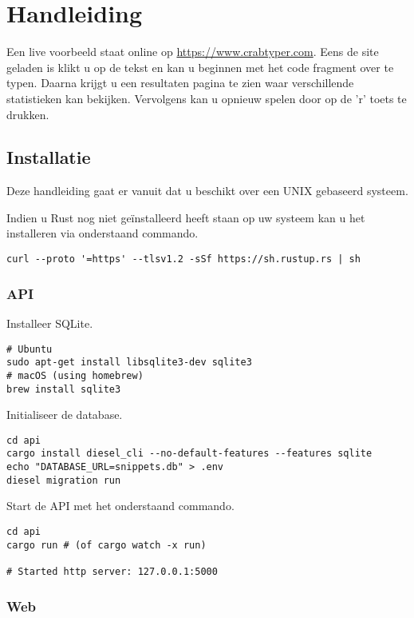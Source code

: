 \chapter{Handleiding}

Een live voorbeeld staat online op \url{https://www.crabtyper.com}. Eens de site geladen is klikt u
op de tekst en kan u beginnen met het code fragment over te typen. Daarna krijgt u een resultaten
pagina te zien waar verschillende statistieken kan bekijken. Vervolgens kan u opnieuw spelen door op
de 'r' toets te drukken.

\section{Installatie}

Deze handleiding gaat er vanuit dat u beschikt over een UNIX gebaseerd systeem.

Indien u Rust nog niet geïnstalleerd heeft staan op uw systeem kan u het installeren via onderstaand
commando.
\begin{verbatim}
curl --proto '=https' --tlsv1.2 -sSf https://sh.rustup.rs | sh
\end{verbatim}

\subsection{API}

Installeer SQLite.
\begin{verbatim}
# Ubuntu
sudo apt-get install libsqlite3-dev sqlite3
# macOS (using homebrew)
brew install sqlite3
\end{verbatim}

Initialiseer de database.
\begin{verbatim}
cd api
cargo install diesel_cli --no-default-features --features sqlite
echo "DATABASE_URL=snippets.db" > .env
diesel migration run
\end{verbatim}

\clearpage

Start de API met het onderstaand commando.
\begin{verbatim}
cd api
cargo run # (of cargo watch -x run)

# Started http server: 127.0.0.1:5000
\end{verbatim}

\subsection{Web}

